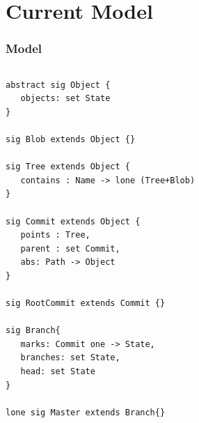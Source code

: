 \documentclass{beamer}
\begin{document}

\section{Current Model}
\begin{frame}[fragile]
   \frametitle{Model}
   \tiny
   \begin{columns}[c]
      \column{1.5in}
         \begin{lstlisting}
abstract sig Object {
   objects: set State
}

sig Blob extends Object {}

sig Tree extends Object {
   contains : Name -> lone (Tree+Blob)
}

sig Commit extends Object {
   points : Tree,
   parent : set Commit,
   abs: Path -> Object
}

sig RootCommit extends Commit {}

sig Branch{
   marks: Commit one -> State,
   branches: set State,
   head: set State
}

lone sig Master extends Branch{}
                  
         \end{lstlisting}
      \column{1.5in}
   \end{columns}
\end{frame}
\end{document}
